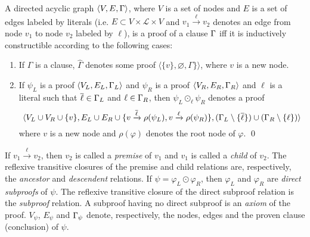 \documentclass{llncs}
\begin{document}
\newcommand{\axiom}[1]{\hat{#1}}
\newcommand{\n}{v}
\newcommand{\raiz}[1]{\rho(#1)}

\begin{definition}[Proof] 
\label{def:proof}
A directed acyclic graph $\langle V, E, \Gamma \rangle$, where $V$ is a set of nodes and $E$ is a
set of edges labeled by literals (i.e. $E \subset V \times \mathcal{L} \times V$ and $\n_1
\xrightarrow{\ell} \n_2$ denotes an edge from node $\n_1$ to node $\n_2$ labeled by $\ell$), is a
proof of a clause $\Gamma$ iff it is inductively constructible according to the following cases:
%
\begin{enumerate}
  \item If $\Gamma$ is a clause, $\axiom{\Gamma}$ denotes some proof $\langle \{ \n \}, \varnothing,
    \Gamma \} \rangle$, where $\n$ is a new node.
  \item If $\psi_L$ is a proof $\langle V_L, E_L, \Gamma_L \rangle$ and
    $\psi_R$ is a proof $\langle V_R, E_R, \Gamma_R \rangle$ and $\ell$ is a literal such that
    $\overline{\ell} \in \Gamma_L$ and $\ell \in \Gamma_R$, then
    $\psi_L \odot_\ell \psi_R$ denotes a proof 
    $$\langle 
    V_L \cup V_R \cup \{\n \},
    E_L \cup E_R \cup \{\n \xrightarrow{\dual{\ell}} \raiz{\psi_L}, \n \xrightarrow{\ell} \raiz{\psi_R}\}, 
    (\clause_L \setminus \{ \dual{\ell} \}) \cup (\clause_R \setminus \{ \ell \})
    \rangle$$
     where $\n$ is a new node and $\raiz{\varphi}$ denotes the root node of $\varphi$.
  \qed
\end{enumerate}
\end{definition}


\newcommand{\Vertices}[1]{V_{#1}}
\newcommand{\Edges}[1]{E_{#1}}
\newcommand{\Conclusion}[1]{\clause_{#1}}

\noindent
If $\n_1 \xrightarrow{\ell} \n_2$, then $\n_2$ is called a \emph{premise} of $\n_1$ and $\n_1$ is
called a \emph{child} of $\n_2$. The reflexive transitive closures of the premise and child relations are,
respectively, the \emph{ancestor} and \emph{descendent} relations. If $\psi = \varphi_L \odot
\varphi_R$, then $\varphi_L$ and $\varphi_R$ are \emph{direct subproofs} of $\psi$. The reflexive transitive
closure of the direct subproof relation is the \emph{subproof} relation. A subproof having no
direct subproof is an \emph{axiom} of the proof.
%
%
$\Vertices{\psi}$, $\Edges{\psi}$ and $\Conclusion{\psi}$
denote, respectively, the nodes, edges and the proven clause (conclusion) of $\psi$.
\end{document}

